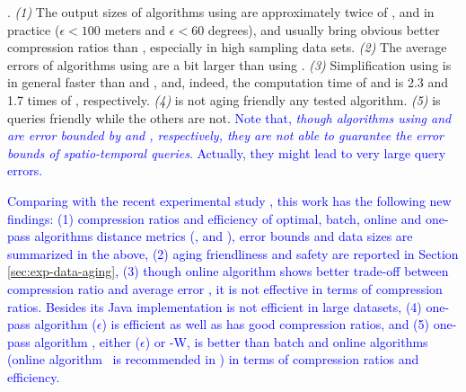 {.
\emph{(1)} The output sizes of algorithms using \sed are approximately twice of \ped, and in practice (\eg $\epsilon <100$ meters and $\epsilon < 60$ degrees), \ped and \sed usually bring obvious better compression ratios than \dad, especially in high sampling data sets.
%
\emph{(2)} The average errors of algorithms using \sed are a bit larger than using \ped.
%
\emph{(3)} Simplification using \dad is in general faster than \ped and \sed, and, indeed, the computation time of \ped and \sed is 2.3 and 1.7 times of \dad, respectively.
%
{\emph{(4)} \dad is not aging friendly \wrt any tested algorithm.}
%
{\emph{(5)} \sed is queries friendly   while the others are not. }
\textcolor{blue}{Note that, \emph{though algorithms using \ped and \dad are error bounded by \ped and \dad, respectively, they are not able to guarantee the error bounds of spatio-temporal queries}. Actually, they might lead to very large query errors.}



\textcolor{blue}{Comparing with the recent experimental study \cite{Zhang:Evaluation}, this work has the following new findings: 
	(1) compression ratios and efficiency of optimal, batch, online and one-pass algorithms \wrt distance metrics (\ped, \sed and \dad), error bounds and data sizes are summarized in the above, 
	(2) aging friendliness and safety are reported in Section \ref{sec:exp-data-aging},
	(3) though online algorithm \dagots shows better trade-off between compression ratio and average error \cite{Zhang:Evaluation}, it is not effective in terms of compression ratios. Besides its Java implementation is not efficient in large datasets,  
	(4) one-pass algorithm \siped ($\epsilon$) is efficient as well as has good compression ratios, and 
	(5) one-pass algorithm \cised, either \cised($\epsilon$) or \cised-W, is better than batch and online algorithms (online algorithm \dagots~is recommended in \cite{Zhang:Evaluation}) in terms of compression ratios and efficiency.}



}
